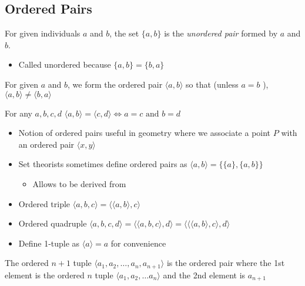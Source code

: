 \subsection{Ordered Pairs}
\begin{definition}
	For given individuals $a$ and $b$, the set $\{a, b\}$ is the \textit{unordered
		pair} formed by $a$ and $b$.
\end{definition}
\begin{itemize}
	\item Called unordered because $\{a,b\} = \{b,a\}$
\end{itemize}

\begin{definition}
	For given $a$ and $b$, we form the ordered pair $\langle a,b\rangle $ so that (unless
	$a=b$ ), $\langle a,b\rangle  \neq \langle b,a\rangle $
\end{definition}

\begin{theorem}
	For any $a,b,c,d$ $\langle a,b\rangle  = \langle c,d\rangle  \iff a=c \text{ and } b=d$
	\label{thm:LOP}
\end{theorem}
\begin{itemize}
	\item Notion of ordered pairs useful in geometry where we associate a point $P$
	      with an ordered pair $\langle x,y\rangle $
	\item Set theorists sometimes define ordered pairs as $\langle a,b\rangle  =
		      \{\{a\},\{a,b\}\}$
	      \begin{itemize}
		      \item Allows  to be derived from
	      \end{itemize}
	\item Ordered triple $\langle a,b,c\rangle  = \langle \langle a,b\rangle ,c\rangle $
	\item Ordered quadruple $\langle a,b,c,d \rangle = \langle \langle a,b,c\rangle ,d\rangle  = \langle \langle \langle a,b\rangle ,c\rangle ,d\rangle $
	\item Define 1-tuple as $\langle a\rangle  = a$ for convenience
\end{itemize}

\begin{definition}
	The ordered $n+1$ tuple $\langle a_1, a_2, \dots, a_n, a_{n+1} \rangle$ is the ordered
	pair where the 1st element is the ordered $n$ tuple $\langle a_1, a_2, \dots
		a_n \rangle$
	and the 2nd element is $a_{n+1}$
\end{definition}

